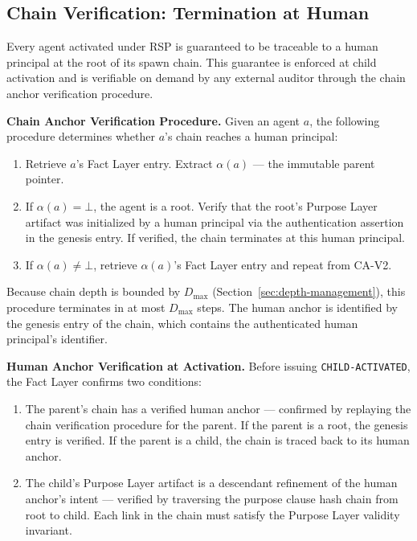 \subsection{Chain Verification: Termination at Human}

Every agent activated under RSP is guaranteed to be traceable to a human principal at the root of its spawn chain. This guarantee is enforced at child activation and is verifiable on demand by any external auditor through the chain anchor verification procedure.

\medskip
\noindent\textbf{Chain Anchor Verification Procedure.} Given an agent $a$, the following procedure determines whether $a$'s chain reaches a human principal:

\begin{enumerate}
  \item[(CA-V1)] Retrieve $a$'s Fact Layer entry. Extract $\alpha(a)$ — the immutable parent pointer.
  \item[(CA-V2)] If $\alpha(a) = \bot$, the agent is a root. Verify that the root's Purpose Layer artifact was initialized by a human principal via the authentication assertion in the genesis entry. If verified, the chain terminates at this human principal.
  \item[(CA-V3)] If $\alpha(a) \neq \bot$, retrieve $\alpha(a)$'s Fact Layer entry and repeat from CA-V2.
\end{enumerate}

Because chain depth is bounded by $D_{\max}$ (Section~\ref{sec:depth-management}), this procedure terminates in at most $D_{\max}$ steps. The human anchor is identified by the genesis entry of the chain, which contains the authenticated human principal's identifier.

\medskip
\noindent\textbf{Human Anchor Verification at Activation.} Before issuing \texttt{CHILD-ACTIVATED}, the Fact Layer confirms two conditions:

\begin{enumerate}
  \item[(HAV-1)] The parent's chain has a verified human anchor — confirmed by replaying the chain verification procedure for the parent. If the parent is a root, the genesis entry is verified. If the parent is a child, the chain is traced back to its human anchor.
  \item[(HAV-2)] The child's Purpose Layer artifact is a descendant refinement of the human anchor's intent — verified by traversing the purpose clause hash chain from root to child. Each link in the chain must satisfy the Purpose Layer validity invariant.
\end{enumerate}

